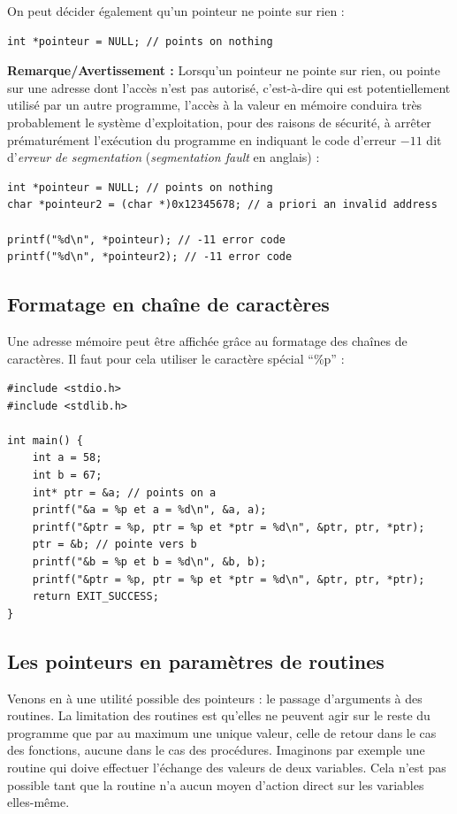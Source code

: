 \documentclass[../../../main.tex]{subfiles}
\begin{document}
On peut décider également qu'un pointeur ne pointe sur rien :
\begin{verbatim}
int *pointeur = NULL; // points on nothing
\end{verbatim}
\textbf{Remarque/Avertissement :} Lorsqu'un pointeur ne pointe sur rien, ou pointe sur une adresse dont l'accès n'est pas autorisé, c'est-à-dire qui est potentiellement utilisé par un autre programme, l'accès à la valeur en mémoire conduira très probablement le système d'exploitation, pour des raisons de sécurité, à arrêter prématurément l'exécution du programme en indiquant le code d'erreur $-11$ dit d'\textit{erreur de segmentation} (\textit{segmentation fault} en anglais) :
\begin{verbatim}
int *pointeur = NULL; // points on nothing
char *pointeur2 = (char *)0x12345678; // a priori an invalid address 

printf("%d\n", *pointeur); // -11 error code
printf("%d\n", *pointeur2); // -11 error code
\end{verbatim}
\subsection{Formatage en chaîne de caractères}
Une adresse mémoire peut être affichée grâce au formatage des chaînes de caractères. Il faut pour cela utiliser le caractère spécial ``\%p'' :
\begin{verbatim}
#include <stdio.h>
#include <stdlib.h>

int main() {
	int a = 58;
	int b = 67;
	int* ptr = &a; // points on a
	printf("&a = %p et a = %d\n", &a, a);
	printf("&ptr = %p, ptr = %p et *ptr = %d\n", &ptr, ptr, *ptr);
	ptr = &b; // pointe vers b
	printf("&b = %p et b = %d\n", &b, b);
	printf("&ptr = %p, ptr = %p et *ptr = %d\n", &ptr, ptr, *ptr);
	return EXIT_SUCCESS;
}
\end{verbatim}
\subsection{Les pointeurs en paramètres de routines}
Venons en à une utilité possible des pointeurs : le passage d'arguments à des routines. La limitation des routines est qu'elles ne peuvent agir sur le reste du programme que par au maximum une unique valeur, celle de retour dans le cas des fonctions, aucune dans le cas des procédures. Imaginons par exemple une routine qui doive effectuer l'échange des valeurs de deux variables. Cela n'est pas possible tant que la routine n'a aucun moyen d'action direct sur les variables elles-même.
\end{document}
